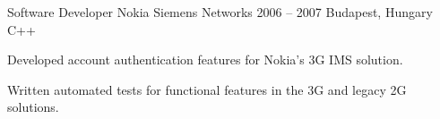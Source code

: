 \cvexperience
  {Software Developer}
  {Nokia Siemens Networks}
  {2006 -- 2007}
  {Budapest, Hungary}
  {C++}
  {%
    \item Developed account authentication features for Nokia's 3G IMS solution.
    \item Written automated tests for functional features in the 3G and legacy 2G solutions.
  }
